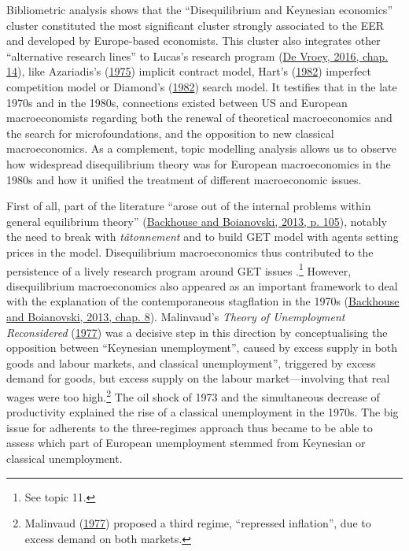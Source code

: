 \documentclass[
]{article}
\begin{document}
Bibliometric analysis shows that the ``Disequilibrium and Keynesian
economics'' cluster constituted the most significant cluster strongly
associated to the EER and developed by Europe-based economists. This
cluster also integrates other ``alternative research lines'' to Lucas's
research program (\protect\hyperlink{ref-devroey2016}{De Vroey, 2016,
chap. 14}), like Azariadis's
(\protect\hyperlink{ref-azariadis1975}{1975}) implicit contract model,
Hart's (\protect\hyperlink{ref-hart1982}{1982}) imperfect competition
model or Diamond's (\protect\hyperlink{ref-diamond1982}{1982}) search
model. It testifies that in the late 1970s and in the 1980s, connections
existed between US and European macroeconomists regarding both the
renewal of theoretical macroeconomics and the search for
microfoundations, and the opposition to new classical macroeconomics. As
a complement, topic modelling analysis allows us to observe how
widespread disequilibrium theory was for European macroeconomics in the
1980s and how it unified the treatment of different macroeconomic
issues.

First of all, part of the literature ``arose out of the internal
problems within general equilibrium theory''
(\protect\hyperlink{ref-backhouseboianovski2013}{Backhouse and
Boianovski, 2013, p. 105}), notably the need to break with
\emph{tâtonnement} and to build GET model with agents setting prices in
the model. Disequilibrium macroeconomics thus contributed to the
persistence of a lively research program around GET issues .\footnote{See
  topic 11.} However, disequilibrium macroeconomics also appeared as an
important framework to deal with the explanation of the contemporaneous
stagflation in the 1970s
(\protect\hyperlink{ref-backhouseboianovski2013}{Backhouse and
Boianovski, 2013, chap. 8}). Malinvaud's \emph{Theory of Unemployment
Reconsidered} (\protect\hyperlink{ref-malinvaud1977}{1977}) was a
decisive step in this direction by conceptualising the opposition
between ``Keynesian unemployment'', caused by excess supply in both
goods and labour markets, and classical unemployment'', triggered by
excess demand for goods, but excess supply on the labour
market---involving that real wages were too high.\footnote{Malinvaud
  (\protect\hyperlink{ref-malinvaud1977}{1977}) proposed a third regime,
  ``repressed inflation'', due to excess demand on both markets.} The
oil shock of 1973 and the simultaneous decrease of productivity
explained the rise of a classical unemployment in the 1970s. The big
issue for adherents to the three-regimes approach thus became to be able
to assess which part of European unemployment stemmed from Keynesian or
classical unemployment.
\end{document}
